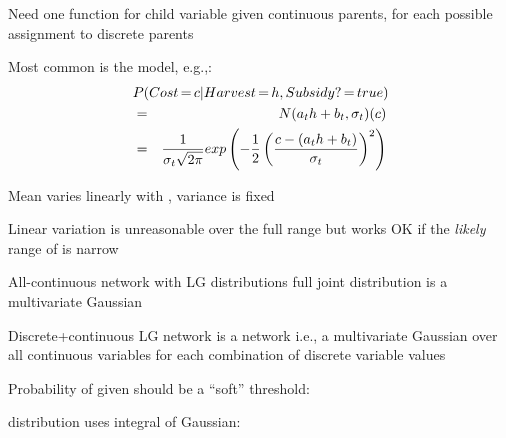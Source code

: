 \documentclass{article}
\begin{document}
\begin{huge}
Need one  function for child variable given
continuous parents, for each possible assignment to discrete parents

Most common is the  model, e.g.,:
\begin{eqnarray*}
\lefteqn{P(Cost\eq c|Harvest\eq h,Subsidy?\eq true)}\\
 & = & N(a_t h + b_t, \sigma_t)(c)\\
 &=& \frac{1}{\sigma_t \sqrt{2\pi}}
 exp\left(-\frac{1}{2} 
          \left(\frac{c-(a_t h + b_t)}{\sigma_t}\right)^2
    \right)
\end{eqnarray*}

Mean  varies linearly with , variance is fixed

Linear variation is unreasonable over the full range\al
  but works OK if the \emph{likely} range of  is narrow


\vspace*{-0.4in}

\textwidth
{}

\vspace*{-0.4in}

All-continuous network with LG distributions\al
  \mat{$\implies$} full joint distribution is a multivariate Gaussian\al

Discrete+continuous LG network is a  network
i.e., a multivariate Gaussian over all continuous variables
for each combination of discrete variable values







Probability of  given  should be a ``soft'' threshold:

\textwidth
{}

 distribution uses integral of Gaussian:\al
  \al
  \\



\end{huge}
\end{document}
